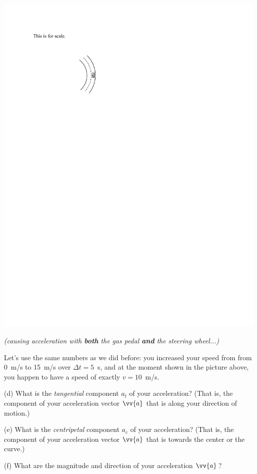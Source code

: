 \hspace{1.0in}\includegraphics{tangential_and_centripetal_acc/curve2.pdf} 
\hspace{-0.2in}
\parbox{2.0 in}{\raggedright{\textit{(causing acceleration \linebreak 
with \textbf{both} the gas pedal \linebreak 
\textbf{and} the steering wheel...)}}}

\bigskip
Let's use the same numbers as we did before: you increased your speed from from 0~m/s to 15~m/s over $\Delta t = 5$~s, and at the moment shown in the picture above, you happen to have a speed of exactly $v=10$~m/s.

(d) What is the \textit{tangential} component $a_t$ of your acceleration?  (That is, the component of your acceleration vector $\vv{a}$ that is along your direction of motion.)
\answerspace{0.4in}

(e) What is the \textit{centripetal} component $a_c$ of your acceleration?  (That is, the component of your acceleration vector $\vv{a}$ that is towards the center or the curve.)
\answerspace{0.4in}

(f) What are the magnitude and direction of your acceleration $\vv{a}\,$?
\answerspace{1.5in}




